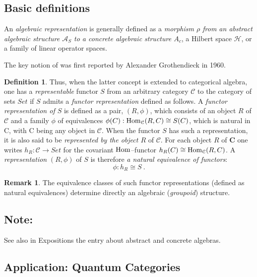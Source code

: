 \documentclass[12pt]{article}
\theoremstyle{plain}
\theoremstyle{definition}
\newtheorem{definition}{Definition}[section]
\newtheorem{remark}{Remark}[section]
\numberwithin{equation}{section}
\newcommand{\Hom}{{\rm Hom}}
\newcommand{\lra}{{\longrightarrow}}
\newcommand{\<}{{\langle}}
\begin{document}
\subsection{Basic definitions}

 An \emph{algebraic representation} is generally defined as a \emph{morphism $\rho$ from an abstract algebraic structure  $\mathcal{A}_S$ to a concrete algebraic structure $A_c$}, a Hilbert space $\mathcal{H}$, or a family of linear operator spaces. 

The key notion of  was first reported by Alexander Grothendieck in 1960.

\begin{definition}
Thus, when the latter concept is extended to categorical algebra, one has  a \emph{representable} functor $S$ from an arbitrary category $\mathcal{C}$ to the category of sets $Set$ if $S$ admits a \emph{functor representation} defined as follows. A \emph{functor representation of $S$} is defined as a pair, $({R}, \phi)$, which consists of an object $R$ of $\mathcal{C}$ and a family $\phi$ of equivalences $\phi (C): \Hom_{\mathcal{C}}(R,C) \cong S(C)$, which is natural in C, with C being any object in $\mathcal{C}$. When the functor $S$ has such a representation, it is also said to be \emph{represented by the object $R$} of $\mathcal{C}$. For each object $R$ of $\mathbf{C}$
one writes $h_{R}: \mathcal{C} \lra Set$ for the covariant $\Hom$--functor $h_{R}(C)\cong \Hom_{\mathcal{C}}(R,C)$. A \emph{representation} $(R, \phi)$ of ${S}$ is therefore \emph{a natural equivalence of functors}: 
\begin{equation}
\phi:  h_{R} \cong {S}~.
\end{equation}
\end{definition}

\begin{remark}
 The equivalence classes of such functor representations (defined as natural equivalences) determine directly an algebraic (\emph{groupoid}) structure.
\end{remark}

\subsection{Note:}
See also  in Expositions the entry about abstract and concrete algebras. 

\subsection{Application: Quantum Categories}
\end{document}
